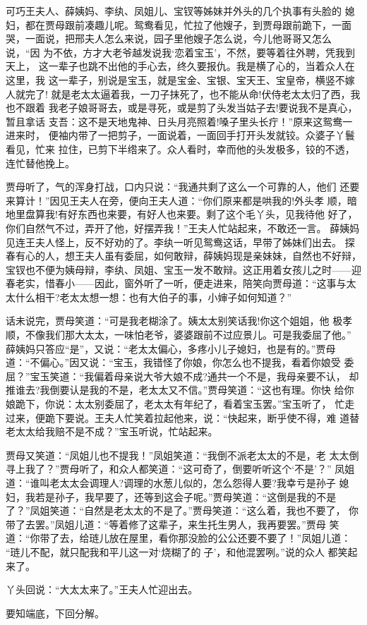 可巧王夫人、薛姨妈、李纨、凤姐儿、宝钗等姊妹并外头的几个执事有头脸的
媳妇，都在贾母跟前凑趣儿呢。鸳鸯看见，忙拉了他嫂子，到贾母跟前跪下，一面
哭，一面说，把邢夫人怎么来说，园子里他嫂子怎么说，今儿他哥哥又怎么说，“因
为不依，方才大老爷越发说我‘恋着宝玉’，不然，要等着往外聘，凭我到天上，
这一辈子也跳不出他的手心去，终久要报仇。我是横了心的，当着众人在这里，我
这一辈子，别说是宝玉，就是宝金、宝银、宝天王、宝皇帝，横竖不嫁人就完了!
就是老太太逼着我，一刀子抹死了，也不能从命!伏侍老太太归了西，我也不跟着
我老子娘哥哥去，或是寻死，或是剪了头发当姑子去!要说我不是真心，暂且拿话
支吾：这不是天地鬼神、日头月亮照着!嗓子里头长疔！”原来这鸳鸯一进来时，
便袖内带了一把剪子，一面说着，一面回手打开头发就铰。众婆子丫鬟看见，忙来
拉住，已剪下半绺来了。众人看时，幸而他的头发极多，铰的不透，连忙替他挽上。

贾母听了，气的浑身打战，口内只说：“我通共剩了这么一个可靠的人，他们
还要来算计！”因见王夫人在旁，便向王夫人道：“你们原来都是哄我的!外头孝
顺，暗地里盘算我!有好东西也来要，有好人也来要。剩了这个毛丫头，见我待他
好了，你们自然气不过，弄开了他，好摆弄我！”王夫人忙站起来，不敢还一言。
薛姨妈见连王夫人怪上，反不好劝的了。李纨一听见鸳鸯这话，早带了姊妹们出去。
探春有心的人，想王夫人虽有委屈，如何敢辩，薛姨妈现是亲妹妹，自然也不好辩，
宝钗也不便为姨母辩，李纨、凤姐、宝玉一发不敢辩。这正用着女孩儿之时——迎
春老实，惜春小——因此，窗外听了一听，便走进来，陪笑向贾母道：“这事与太
太什么相干?老太太想一想：也有大伯子的事，小婶子如何知道？”

话未说完，贾母笑道：“可是我老糊涂了。姨太太别笑话我!你这个姐姐，他
极孝顺，不像我们那大太太，一味怕老爷，婆婆跟前不过应景儿。可是我委屈了他。”
薛姨妈只答应“是”，又说：“老太太偏心，多疼小儿子媳妇，也是有的。”贾母
道：“不偏心。”因又说：“宝玉，我错怪了你娘，你怎么也不提我，看着你娘受
委屈？”宝玉笑道：“我偏着母亲说大爷大娘不成?通共一个不是，我母亲要不认，
却推谁去?我倒要认是我的不是，老太太又不信。”贾母笑道：“这也有理。你快
给你娘跪下，你说：太太别委屈了，老太太有年纪了，看着宝玉罢。”宝玉听了，
忙走过来，便跪下要说。王夫人忙笑着拉起他来，说：“快起来，断乎使不得，难
道替老太太给我赔不是不成？”宝玉听说，忙站起来。

贾母又笑道：“凤姐儿也不提我！”凤姐笑道：“我倒不派老太太的不是，老
太太倒寻上我了？”贾母听了，和众人都笑道：“这可奇了，倒要听听这个‘不是’？”
凤姐道：“谁叫老太太会调理人?调理的水葱儿似的，怎么怨得人要?我幸亏是孙子
媳妇，我若是孙子，我早要了，还等到这会子呢。”贾母笑道：“这倒是我的不是
了？”凤姐笑道：“自然是老太太的不是了。”贾母笑道：“这么着，我也不要了，
你带了去罢。”凤姐儿道：“等着修了这辈子，来生托生男人，我再要罢。”贾母
笑道：“你带了去，给琏儿放在屋里，看你那没脸的公公还要不要了！”凤姐儿道：
“琏儿不配，就只配我和平儿这一对‘烧糊了的子’，和他混罢咧。”说的众人
都笑起来了。

丫头回说：“大太太来了。”王夫人忙迎出去。

要知端底，下回分解。